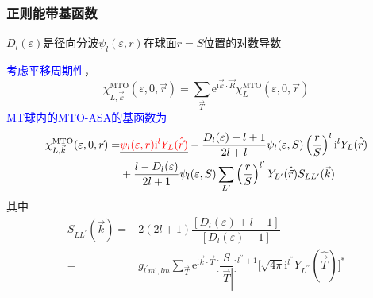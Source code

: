 \documentclass[cjk,slidestop,compress,mathserif,blue]{beamer}
\begin{document}
\frame
{
	\frametitle{正则能带基函数}
	$D_l(\varepsilon)$是径向分波$\psi_l(\varepsilon,r)$在球面$r=S$位置的对数导数

	\textcolor{blue}{考虑平移周期性}，
$$\chi_{L,\vec k}^{\mathrm{MTO}}(\varepsilon,0,\vec r)=\sum_{\vec T}\mathrm{e}^{\mathrm{i}\vec k\cdot\vec R}\chi_L^{\mathrm{MTO}}(\varepsilon,0,\vec r)$$
\textcolor{blue}{\textrm{MT}球内的\textrm{MTO-ASA}的基函数为}
\begin{displaymath}
	\begin{aligned}
		\chi_{L,\vec k}^{\mathrm{MTO}}(\varepsilon,0,\vec r)=&\underline{\textcolor{red}{\psi_l(\varepsilon,r)\mathrm{i}^lY_L(\hat{\vec r})}}-\dfrac{D_l(\varepsilon)+l+1}{2l+l}\psi_l(\varepsilon,S)\left(\dfrac rS\right)^l\mathrm{i}^lY_L(\hat{\vec r})\\
		&+\dfrac{l-D_l(\varepsilon)}{2l+1}\psi_l(\varepsilon,S)\sum_{L^{\prime}}\left(\dfrac rS\right)^{l^{\prime}}Y_{L^{\prime}}(\hat{\vec r})S_{LL^{\prime}}(\vec k)
	\end{aligned}
\end{displaymath}
其中
\begin{displaymath}
	\begin{aligned}
		S_{LL^{\prime}}(\vec k)=&2(2l+1)\dfrac{[D_l(\varepsilon)+l+1]}{[D_l(\varepsilon)-1]}\\
		=&g_{l^{\prime}m^{\prime},lm}\sum_{\vec T}\mathrm{e}^{\mathrm{i}\vec k\cdot\vec T}\bigg[\dfrac S{|\vec T|}\bigg]^{l^{\prime\prime}+1}\big[\sqrt{4\pi}\mathrm{i}^{l^{\prime\prime}}Y_{L^{\prime\prime}}(\hat{\vec T})\big]^{\ast}
	\end{aligned}
\end{displaymath}
}
\end{document}
